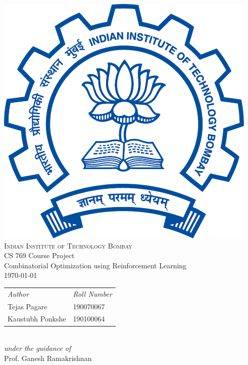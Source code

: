 \documentclass{article}
\theoremstyle{definition}
\def\date{\today}                         %
\begin{document}
\begin{center}
    \vspace*{1.5cm}
    \includegraphics[scale = 0.5]{iitb-logo.png}\\[1.75cm]
    \textsc{\color[RGB]{0, 51, 102}\LARGE{Indian Institute of Technology Bombay}}\\[1cm]
    {\Large{CS 769 Course Project }}\\[.5cm]
   {\Large{Combinatorial Optimization using Reinforcement Learning}}\\[.5cm]
    \textsc{\date}\\[2cm]
    \Large{
    \begin{tabular}{L{5cm} R{4cm}}
        \textit{Author} &  \textit{Roll Number}\\
        Tejas Pagare & 190070067\\
        Kaustubh Ponkshe & 190100064
    \end{tabular}
    }\\
    \vspace{1cm}
    \textit{under the guidance of}
    \\\vspace{1cm}
    Prof. Ganesh Ramakrishnan\\
    \vspace{0.2cm}
    
\end{center}
\thispagestyle{empty}
\pagebreak
\end{document}
